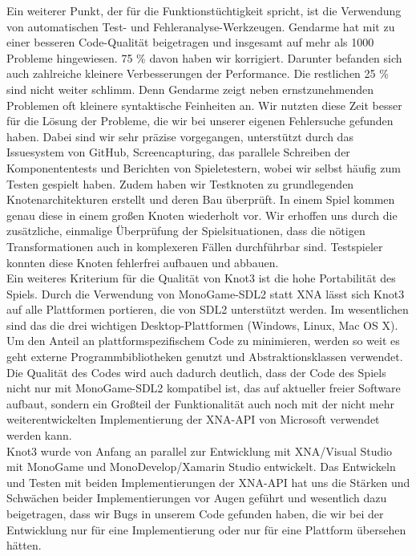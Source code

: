 Ein weiterer Punkt, der für die Funktionstüchtigkeit spricht, ist die Verwendung von automatischen Test- und Fehleranalyse-Werkzeugen. Gendarme hat mit zu einer besseren Code-Qualität beigetragen und insgesamt auf mehr als 1000 Probleme hingewiesen. 75 \% davon haben wir korrigiert. Darunter befanden sich auch zahlreiche kleinere Verbesserungen der Performance. Die restlichen 25 \% sind nicht weiter schlimm. Denn Gendarme zeigt neben ernstzunehmenden Problemen oft kleinere syntaktische Feinheiten an. Wir nutzten diese Zeit besser für die Lösung der Probleme, die wir bei unserer eigenen Fehlersuche gefunden haben. Dabei sind wir sehr präzise vorgegangen, unterstützt durch das Issuesystem von GitHub, Screencapturing, das parallele Schreiben der Komponententests und Berichten von Spieletestern, wobei wir selbst häufig zum Testen gespielt haben. Zudem haben wir Testknoten zu grundlegenden Knotenarchitekturen erstellt und deren Bau überprüft. In einem Spiel kommen genau diese in einem großen Knoten wiederholt vor. Wir erhoffen uns durch die zusätzliche, einmalige Überprüfung der Spielsituationen, dass die nötigen Transformationen auch in komplexeren Fällen durchführbar sind. Testspieler konnten diese Knoten fehlerfrei aufbauen und abbauen.\\

Ein weiteres Kriterium für die Qualität von Knot3 ist die hohe Portabilität des Spiels. Durch die Verwendung von MonoGame-SDL2 statt XNA lässt sich Knot3 auf alle Plattformen portieren, die von SDL2 unterstützt werden. Im wesentlichen sind das die drei wichtigen Desktop-Plattformen (Windows, Linux, Mac OS X).\\

Um den Anteil an plattformspezifischem Code zu minimieren, werden so weit es geht externe Programmbibliotheken genutzt und Abstraktionsklassen verwendet. Die Qualität des Codes wird auch dadurch deutlich, dass der Code des Spiels nicht nur mit MonoGame-SDL2 kompatibel ist, das auf aktueller freier Software aufbaut, sondern ein Großteil der Funktionalität auch noch mit der nicht mehr weiterentwickelten Implementierung der XNA-API von Microsoft verwendet werden kann.\\

Knot3 wurde von Anfang an parallel zur Entwicklung mit XNA/Visual Studio mit MonoGame und MonoDevelop/Xamarin Studio entwickelt. Das Entwickeln und Testen mit beiden Implementierungen der XNA-API hat uns die Stärken und Schwächen beider Implementierungen vor Augen geführt und wesentlich dazu beigetragen, dass wir Bugs in unserem Code gefunden haben, die wir bei der Entwicklung nur für eine Implementierung oder nur für eine Plattform übersehen hätten.\\

